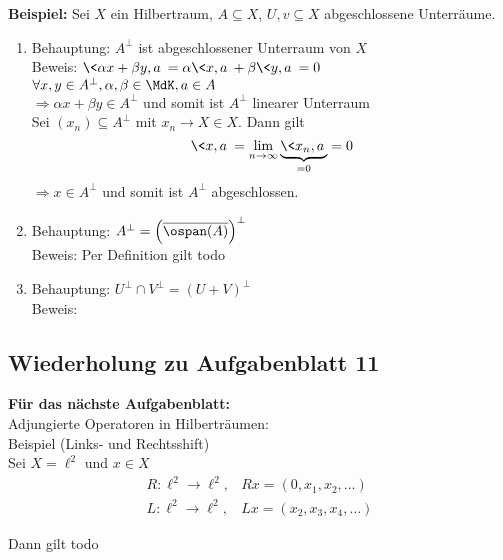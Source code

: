 \textbf{Beispiel:}
Sei $X$ ein Hilbertraum, $A \subseteq X$, $U, v \subseteq X$ abgeschlossene Unterräume.
\begin{enumerate}[label=\alph*\upshape)]
	\item Behauptung: $A^{\bot}$ ist abgeschlossener Unterraum von $X$ \\
		Beweis: $\< \alpha x + \beta y , a \> = \alpha \< x , a \> + \beta \< y , a \> = 0$ $\forall x , y \in A^{\bot}, \alpha, \beta \in \MdK, a \in A$ \\
		$\Rightarrow \alpha x + \beta y \in A^{\bot}$ und somit ist $A^{\bot}$ linearer Unterraum \\
		Sei $(x_{n}) \subseteq A^{\bot}$ mit $x_{n} \rightarrow X \in X$. Dann gilt
		\[ \< x , a \> = \lim_{n \rightarrow \infty} \underbrace{\< x_{n} , a \>}_{= 0} = 0 \]
		$\Rightarrow x \in A^{\bot}$ und somit ist $A^{\bot}$ abgeschlossen.
	\item Behauptung: $A^{\bot} = \left( \overline{\ospan(A)} \right)^{\bot}$ \\
		Beweis: Per Definition gilt todo %
	\item Behauptung: $U^{\bot} \cap V^{\bot} = \left( U + V \right)^{\bot}$ \\
		Beweis:
\end{enumerate}


\subsection*{Wiederholung zu Aufgabenblatt 11}

\textbf{Für das nächste Aufgabenblatt:} \\
Adjungierte Operatoren in Hilberträumen: \\

Beispiel (Links- und Rechtsshift) \\
Sei $X = \ell^{2}$ und $x \in X$
\begin{align*}
	R \colon \ell^{2} \rightarrow \ell^{2}, & R x = ( 0 , x_{1} , x_{2}, \dotsc) \\
	L \colon \ell^{2} \rightarrow \ell^{2}, & L x = ( x_{2}, x_{3}, x_{4}, \dotsc)
\end{align*}

Dann gilt todo %


\newpage